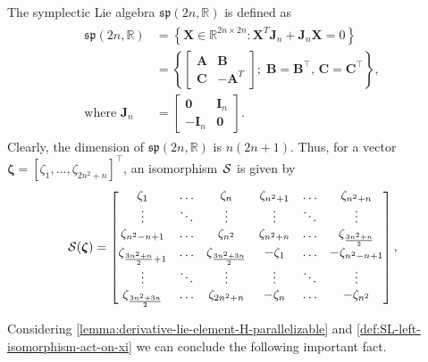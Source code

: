 \begin{example}
    The symplectic Lie algebra $\mathfrak{sp}(2n, \mathbb{R})$ is defined as
    \begin{align}
        \begin{split}
            \mathfrak{sp}(2n, \mathbb{R}) &= \left\{ \mathbf{X} \in \mathbb{R}^{2n\times 2n} : \mathbf{X}^T\mathbf{J}_{n} + \mathbf{J}_{n}\mathbf{X} = 0 \right\} \\&= \left\{ \begin{bmatrix} \mathbf{A} & \mathbf{B} \\ \mathbf{C} & -\mathbf{A}^T \end{bmatrix};\; \mathbf{B} = \mathbf{B}^\top,\, \mathbf{C} = \mathbf{C}^\top\right\},\\
            \text{where }\mathbf{J}_{n} &= \begin{bmatrix} \mathbf{0} & \mathbf{I}_n \\ -\mathbf{I}_n & \mathbf{0} \end{bmatrix}.            
        \end{split}
    \end{align}
    Clearly, the dimension of $\mathfrak{sp}(2n, \mathbb{R})$ is $n(2n + 1)$. Thus,
    for a vector $\boldsymbol{\zeta} = [\zeta_1, \dots, \zeta_{2n^2+n}]^\top$, an isomorphism $\SL$ is given by
    \begin{align}
        \SL[\boldsymbol{\zeta}] = \begin{bmatrix}
            \zeta_1 & \dots & \zeta_n & \zeta_{n^2 + 1} & \dots & \zeta_{n^2 + n} \\
            \vdots & \ddots & \vdots & \vdots & \ddots & \vdots \\
            \zeta_{n^2 - n + 1} & \dots & \zeta_{n^2} & \zeta_{n^2 + n} & \dots & \zeta_{\frac{3n^2+n}{2}}\\
            \zeta_{\frac{3n^2+n}{2} + 1} & \dots & \zeta_{\frac{3n^2+3n}{2}} & -\zeta_1 & \dots & -\zeta_{n^2 - n + 1}\\
            \vdots & \ddots & \vdots & \vdots & \ddots & \vdots\\
            \zeta_{\frac{3n^2+3n}{2}} & \dots & \zeta_{2n^2 + n}& -\zeta_n & \dots & -\zeta_{n^2} 
        \end{bmatrix},
    \end{align}
\end{example}

Considering \autoref{lemma:derivative-lie-element-H-parallelizable} and \autoref{def:SL-left-isomorphism-act-on-xi} we can conclude the following important fact.

